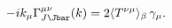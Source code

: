 \begin{equation}
  -ik_\mu\Gamma_{J\smash[t]{\Jbar}}^{\mu\nu}(k)= 2\langle
  T^{\nu\mu}\rangle_\beta\,\gamma_\mu.
\end{equation}

